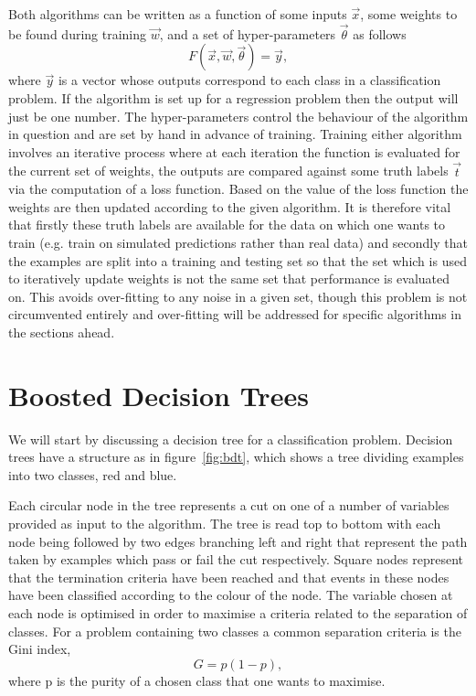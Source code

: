 Both algorithms can be written as a function of some inputs $\vec{x}$, some
weights to be found during training $\vec{w}$, and a set of hyper-parameters
$\vec{\theta}$ as follows
\begin{equation}
  F(\vec{x}, \vec{w}, \vec{\theta}) = \vec{y},
  \label{eq:ml-general}
\end{equation}
where $\vec{y}$ is a vector whose outputs correspond to each class in a
classification problem. If the algorithm is set up for a regression problem then
the output will just be one number. The hyper-parameters control the behaviour
of the algorithm in question and are set by hand in advance of training.
Training either algorithm involves an iterative process where at each iteration
the function is evaluated for the current set of weights, the outputs are
compared against some truth labels $\vec{t}$ via the computation of a loss
function. Based on the value of the loss function the weights are then updated
according to the given algorithm. It is therefore vital that firstly these truth
labels are available for the data on which one wants to train (e.g. train on
simulated predictions rather than real data) and secondly that the examples are
split into a training and testing set so that the set which is used to
iteratively update weights is not the same set that performance is evaluated on.
This avoids over-fitting to any noise in a given set, though this problem is not
circumvented entirely and over-fitting will be addressed for specific algorithms
in the sections ahead.

\section{Boosted Decision Trees}%
\label{sec:bdts}
We will start by discussing a decision tree for a classification problem.
Decision trees have a structure as in figure~\ref{fig:bdt}, which shows a tree
dividing examples into two classes, red and blue.

Each circular node in the tree represents a cut on one of a number of variables
provided as input to the algorithm. The tree is read top to bottom with each
node being followed by two edges branching left and right that represent the
path taken by examples which pass or fail the cut respectively. Square nodes
represent that the termination criteria have been reached and that events in
these nodes have been classified according to the colour of the node. The
variable chosen at each node is optimised in order to maximise a criteria
related to the separation of classes.  For a problem containing two classes a
common separation criteria is the Gini index,
\begin{equation}
  G = p(1-p),
  \label{eq:gini}
\end{equation}
where p is the purity of a chosen class that one wants to maximise.

